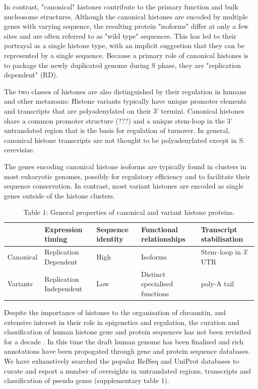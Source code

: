 \documentclass[10pt,a4paper,draft]{article}
\newcommand{\think}[2][]{\todo[size=\small, caption={think about this}#1]{\renewcommand{\baselinestretch}{0.5}\selectfont#2\par}} %
\begin{document}
In contrast, "canonical" histones contribute to the primary function and bulk nucleosome structures. Although the canonical histones are encoded by multiple genes with varying sequence, the resulting protein "isoforms" differ at only a few sites and are often referred to as "wild type" sequences. This has led to their portrayal as a single histone type, with an implicit suggestion that they can be represented by a single sequence. Because a primary role of canonical histones is to package the newly duplicated genome during S phase, they are "replication dependent" (RD).

The two classes of histones are also distinguished by their regulation in humans and other metazoans: Histone variants typically have unique promoter elements and transcripts that are polyadenylated on their 3' termini. \think{Are they transcribed by pol II?} Canonical histones share a common promoter structure (???) and a unique stem-loop in the 3' untranslated region that is the basis for regulation of turnover. In general, canonical histone transcripts are not thought to be polyadenylated except in S. cerevisiae.

The genes encoding canonical histone isoforms are typically found in clusters in most eukaryotic genomes, possibly for regulatory efficiency and to facilitate their sequence conservation. In contrast, most variant histones are encoded as single genes outside of the histone clusters.

      \begin{table}
        \centering
        \begin{tabular}{l | l | l | l | l }
          \null     & Expression timing       & Sequence identity & Functional relationships    & Transcript stabilisation \\
          \hline
          Canonical & Replication Dependent   & High              & Isoforms & Stem--loop in 3' UTR \\
          Variants  & Replication Independent & Low               & Distinct specialised functions& poly-A tail \\
        \end{tabular}
        \caption{Table 1: General properties of canonical and variant histone proteins.}
        \label{tab:typical-histone-differences}
      \end{table}

Despite the importance of histones to the organisation of chroamtin, and extensive interest in their role in epigenetics and regulation, the curation and classification of human histone gene and protein sequences has not been revisited for a decade \cite{Marzluff02}. In this time the draft human genome has been finalised and rich annotations have been propogated through gene and protein sequence databases. We have exhaustively searched the popular RefSeq and UniProt databases to curate and report a number of oversights in untranslated regions, transcripts and classification of pseudo genes (supplementary table 1).
\end{document}
